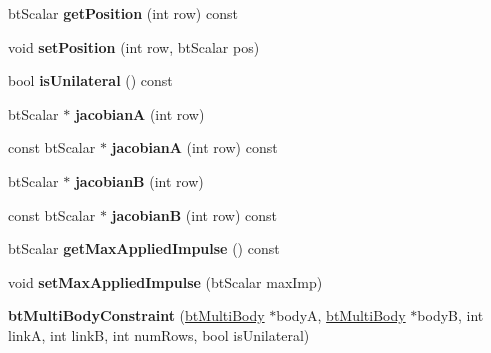 \begin{DoxyCompactItemize}
bt\+Scalar {\bfseries get\+Position} (int row) const
\item 
\mbox{\label{classbtMultiBodyConstraint_a3c312406ee40987dc8fb52cc1ba56243}} 
void {\bfseries set\+Position} (int row, bt\+Scalar pos)
\item 
\mbox{\label{classbtMultiBodyConstraint_ab4c15869729f6fd71583498ad3b0bf39}} 
bool {\bfseries is\+Unilateral} () const
\item 
\mbox{\label{classbtMultiBodyConstraint_aa450060c157dad0dbe7af57b49293af8}} 
bt\+Scalar $\ast$ {\bfseries jacobianA} (int row)
\item 
\mbox{\label{classbtMultiBodyConstraint_a57d24815cf10d92eacd942792782c809}} 
const bt\+Scalar $\ast$ {\bfseries jacobianA} (int row) const
\item 
\mbox{\label{classbtMultiBodyConstraint_aa712ee74160dbb266f5def990011e891}} 
bt\+Scalar $\ast$ {\bfseries jacobianB} (int row)
\item 
\mbox{\label{classbtMultiBodyConstraint_a9c524b82b4e19f3a6a7a445a59cf215b}} 
const bt\+Scalar $\ast$ {\bfseries jacobianB} (int row) const
\item 
\mbox{\label{classbtMultiBodyConstraint_acbb8b7711d2fbe43027fe4ed7a9f2b91}} 
bt\+Scalar {\bfseries get\+Max\+Applied\+Impulse} () const
\item 
\mbox{\label{classbtMultiBodyConstraint_aa5c88ed393fe5d4f1e0b1f840117bbe7}} 
void {\bfseries set\+Max\+Applied\+Impulse} (bt\+Scalar max\+Imp)
\item 
\mbox{\label{classbtMultiBodyConstraint_aab943d7ae4486ecac8029f984d955894}} 
{\bfseries bt\+Multi\+Body\+Constraint} (\hyperlink{classbtMultiBody}{bt\+Multi\+Body} $\ast$bodyA, \hyperlink{classbtMultiBody}{bt\+Multi\+Body} $\ast$bodyB, int linkA, int linkB, int num\+Rows, bool is\+Unilateral)
\item 
\mbox{\label{classbtMultiBodyConstraint_a1e78beb29c2694257d6ca681cea2cfda}} 

\end{DoxyCompactItemize}
